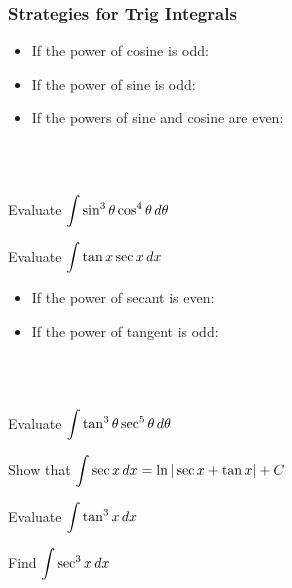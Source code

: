 \documentclass[notes]{subfiles}
\begin{document}
	\subsubsection*{Strategies for Trig Integrals}
		\begin{rmk}
			\begin{itemize}
				\setlength \itemsep{60pt}
				\item If the power of cosine is odd: 
				\item If the power of sine is odd:
				\item If the powers of sine and cosine are even: 
			\end{itemize}\\ \\ 
		\end{rmk}
		
		\begin{ex}
			Evaluate $\displaystyle \int \sin^3\theta\cos^4\theta \, d\theta$
		\end{ex}
			\newpage
			
		\begin{ex}
			Evaluate $\displaystyle \int \tan x \sec x\, dx$
		\end{ex}
			
		\begin{rmk}
			\begin{itemize}
				\setlength\itemsep{60pt}
				\item If the power of secant is even:
				\item If the power of tangent is odd:
			\end{itemize}\\ \\
		\end{rmk}
		\begin{ex}
			Evaluate $\displaystyle \int \tan^3\theta\sec^5\theta\, d\theta$
		\end{ex}
			\newpage
			
		\begin{ex}
			Show that $\displaystyle \int \sec x\, dx = \ln |\sec x + \tan x| + C$
		\end{ex}
		
		\begin{ex}
			Evaluate $\displaystyle \int \tan^3x\, dx$
		\end{ex}	
			
		\begin{ex}
			Find $\displaystyle \int \sec^3x\, dx$
		\end{ex}
			\newpage
			
\end{document}
